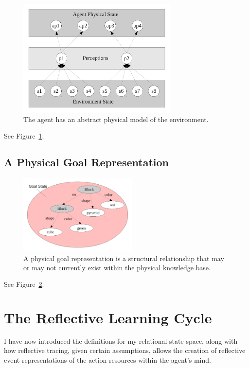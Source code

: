 \begin{figure}[bth]
  \center
  \includegraphics[width=8cm]{gfx/environment_perception_physical}
  \caption[The agent has an abstract physical model of the
    environment]{The agent has an abstract physical model of the
    environment.}
  \label{fig:environment_perception_physical}
\end{figure}

See Figure~\ref{fig:environment_perception_physical}.


\subsection{A Physical Goal Representation}

\begin{figure}[bth]
  \center
  \includegraphics[height=4cm]{gfx/goal_state}
  \caption[A physical goal representation]{A physical goal
    representation is a structural relationship that may or may not
    currently exist within the physical knowledge base.}
  \label{fig:goal_state}
\end{figure}

See Figure~\ref{fig:goal_state}.


\section{The Reflective Learning Cycle}

I have now introduced the definitions for my relational state space,
along with how reflective tracing, given certain assumptions, allows
the creation of reflective event representations of the action
resources within the agent's mind.

